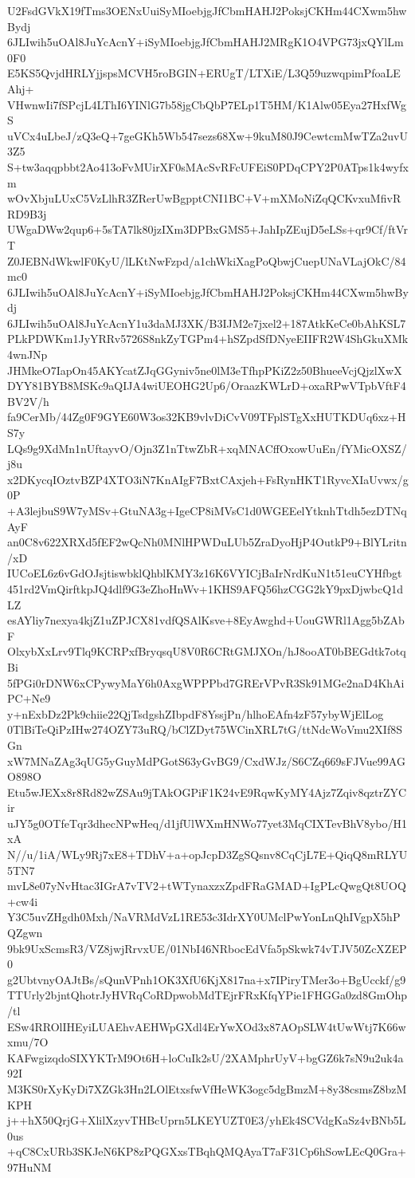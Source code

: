 U2FsdGVkX19fTms3OENxUuiSyMIoebjgJfCbmHAHJ2PoksjCKHm44CXwm5hwBydj
6JLIwih5uOAl8JuYcAcnY+iSyMIoebjgJfCbmHAHJ2MRgK1O4VPG73jxQYlLm0F0
E5KS5QvjdHRLYjjspsMCVH5roBGIN+ERUgT/LTXiE/L3Q59uzwqpimPfoaLEAhj+
VHwnwIi7fSPcjL4LThI6YINlG7b58jgCbQbP7ELp1T5HM/K1Alw05Eya27HxfWgS
uVCx4uLbeJ/zQ3eQ+7geGKh5Wb547sezs68Xw+9kuM80J9CewtcmMwTZa2uvU3Z5
S+tw3aqqpbbt2Ao413oFvMUirXF0sMAcSvRFcUFEiS0PDqCPY2P0ATps1k4wyfxm
wOvXbjuLUxC5VzLlhR3ZRerUwBgpptCNI1BC+V+mXMoNiZqQCKvxuMfivRRD9B3j
UWgaDWw2qup6+5sTA7lk80jzIXm3DPBxGMS5+JahIpZEujD5eLSs+qr9Cf/ftVrT
Z0JEBNdWkwlF0KyU/lLKtNwFzpd/a1chWkiXagPoQbwjCuepUNaVLajOkC/84mc0
6JLIwih5uOAl8JuYcAcnY+iSyMIoebjgJfCbmHAHJ2PoksjCKHm44CXwm5hwBydj
6JLIwih5uOAl8JuYcAcnY1u3daMJ3XK/B3IJM2e7jxel2+187AtkKeCe0bAhKSL7
PLkPDWKm1JyYRRv5726S8nkZyTGPm4+hSZpdSfDNyeEIIFR2W4ShGkuXMk4wnJNp
JHMkeO7IapOn45AKYcatZJqGGyniv5ne0lM3eTfhpPKiZ2z50BhueeVcjQjzlXwX
DYY81BYB8MSKc9aQIJA4wiUEOHG2Up6/OraazKWLrD+oxaRPwVTpbVftF4BV2V/h
fa9CerMb/44Zg0F9GYE60W3os32KB9vlvDiCvV09TFplSTgXxHUTKDUq6xz+HS7y
LQs9g9XdMn1nUftayvO/Ojn3Z1nTtwZbR+xqMNACffOxowUuEn/fYMicOXSZ/j8u
x2DKycqIOztvBZP4XTO3iN7KnAIgF7BxtCAxjeh+FsRynHKT1RyvcXIaUvwx/g0P
+A3lejbuS9W7yMSv+GtuNA3g+IgeCP8iMVsC1d0WGEEelYtknhTtdh5ezDTNqAyF
an0C8v622XRXd5fEF2wQcNh0MNlHPWDuLUb5ZraDyoHjP4OutkP9+BlYLritn/xD
IUCoEL6z6vGdOJsjtiswbklQhblKMY3z16K6VYICjBaIrNrdKuN1t51euCYHfbgt
451rd2VmQirftkpJQ4dlf9G3eZhoHnWv+1KHS9AFQ56hzCGG2kY9pxDjwbcQ1dLZ
esAYliy7nexya4kjZ1uZPJCX81vdfQSAlKsve+8EyAwghd+UouGWRl1Agg5bZAbF
OlxybXxLrv9Tlq9KCRPxfBryqsqU8V0R6CRtGMJXOn/hJ8ooAT0bBEGdtk7otqBi
5fPGi0rDNW6xCPywyMaY6h0AxgWPPPbd7GRErVPvR3Sk91MGe2naD4KhAiPC+Ne9
y+nExbDz2Pk9chiie22QjTsdgshZIbpdF8YssjPn/hlhoEAfn4zF57ybyWjElLog
0TlBiTeQiPzIHw274OZY73uRQ/bClZDyt75WCinXRL7tG/ttNdcWoVmu2XIf8SGn
xW7MNaZAg3qUG5yGuyMdPGotS63yGvBG9/CxdWJz/S6CZq669sFJVue99AGO898O
Etu5wJEXx8r8Rd82wZSAu9jTAkOGPiF1K24vE9RqwKyMY4Ajz7Zqiv8qztrZYCir
uJY5g0OTfeTqr3dhecNPwHeq/d1jfUlWXmHNWo77yet3MqCIXTevBhV8ybo/H1xA
N//u/1iA/WLy9Rj7xE8+TDhV+a+opJcpD3ZgSQsnv8CqCjL7E+QiqQ8mRLYU5TN7
mvL8e07yNvHtac3IGrA7vTV2+tWTynaxzxZpdFRaGMAD+IgPLcQwgQt8UOQ+cw4i
Y3C5uvZHgdh0Mxh/NaVRMdVzL1RE53c3IdrXY0UMclPwYonLnQhIVgpX5hPQZgwn
9bk9UxScmsR3/VZ8jwjRrvxUE/01NbI46NRbocEdVfa5pSkwk74vTJV50ZcXZEP0
g2UbtvnyOAJtBs/sQunVPnh1OK3XfU6KjX817na+x7IPiryTMer3o+BgUcckf/g9
TTUrly2bjntQhotrJyHVRqCoRDpwobMdTEjrFRxKfqYPie1FHGGa0zd8GmOhp/tl
ESw4RROlIHEyiLUAEhvAEHWpGXdl4ErYwXOd3x87AOpSLW4tUwWtj7K66wxmu/7O
KAFwgizqdoSIXYKTrM9Ot6H+loCuIk2sU/2XAMphrUyV+bgGZ6k7sN9u2uk4a92I
M3KS0rXyKyDi7XZGk3Hn2LOlEtxsfwVfHeWK3ogc5dgBmzM+8y38csmsZ8bzMKPH
j++hX50QrjG+XlilXzyvTHBcUprn5LKEYUZT0E3/yhEk4SCVdgKaSz4vBNb5L0us
+qC8CxURb3SKJeN6KP8zPQGXxsTBqhQMQAyaT7aF31Cp6hSowLEcQ0Gra+97HuNM
